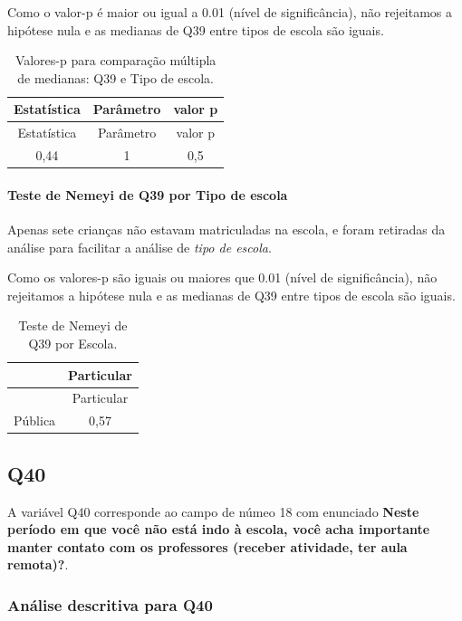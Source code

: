 \documentclass[]{article}
\let\oldparagraph\paragraph
\renewcommand{\paragraph}[1]{\oldparagraph{#1}\mbox{}}
\begin{document}
Como o valor-p é maior ou igual a 0.01 (nível de significância), não rejeitamos a hipótese nula e as medianas de Q39 entre tipos de escola são iguais.

\begin{longtable}[]{@{}ccc@{}}
\caption{\label{tab:unnamed-chunk-1535}Valores-p para comparação múltipla de medianas: Q39 e Tipo de escola.}\tabularnewline
\toprule
Estatística & Parâmetro & valor p\tabularnewline
\midrule
\endfirsthead
\toprule
Estatística & Parâmetro & valor p\tabularnewline
\midrule
\endhead
0,44 & 1 & 0,5\tabularnewline
\bottomrule
\end{longtable}

\hypertarget{teste-de-nemeyi-de-q39-por-tipo-de-escola}{%
\paragraph{Teste de Nemeyi de Q39 por Tipo de escola}\label{teste-de-nemeyi-de-q39-por-tipo-de-escola}}

Apenas sete crianças não estavam matriculadas na escola, e foram retiradas da análise para facilitar a análise de \emph{tipo de escola}.

Como os valores-p são iguais ou maiores que 0.01 (nível de significância), não rejeitamos a hipótese nula e as medianas de Q39 entre tipos de escola são iguais.

\begin{longtable}[]{@{}lc@{}}
\caption{\label{tab:unnamed-chunk-1537}Teste de Nemeyi de Q39 por Escola.}\tabularnewline
\toprule
& Particular\tabularnewline
\midrule
\endfirsthead
\toprule
& Particular\tabularnewline
\midrule
\endhead
Pública & 0,57\tabularnewline
\bottomrule
\end{longtable}

\cleardoublepage

\hypertarget{q40}{%
\subsection{Q40}\label{q40}}

A variável Q40 corresponde ao campo de númeo 18 com enunciado \textbf{Neste período em que você não está indo à escola, você acha importante manter contato com os professores (receber atividade, ter aula remota)?}.

\hypertarget{anuxe1lise-descritiva-para-q40}{%
\subsubsection{Análise descritiva para Q40}\label{anuxe1lise-descritiva-para-q40}}
\end{document}
